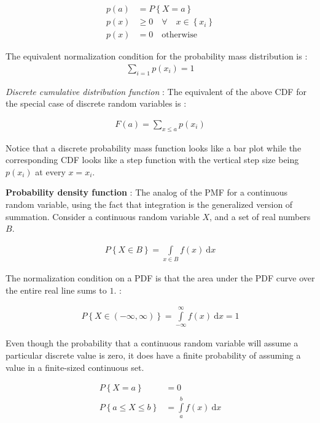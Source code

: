 \begin{align}
	p(a) &= P \left\{X = a\right\} \\
	p(x) &\geq 0 \quad \forall \quad x \in \left\{x_i\right\} \\
	p(x) &= 0 \quad \text{otherwise}
\end{align}

The equivalent normalization condition for the probability mass distribution is : 
\begin{align}
	\sum\limits_{i = 1} p(x_i) = 1
\end{align}

\textit{Discrete cumulative distribution function} : The equivalent of the above CDF for the special case of discrete random variables is : 

\begin{align}
	F(a) = \sum\limits_{x \leq a} p(x_i)
\end{align}

Notice that a discrete probability mass function looks like a bar plot while the corresponding CDF looks like a step function with the vertical step size being $ p(x_i) $ at every $ x = x_i $.

\textbf{Probability density function} : The analog of the PMF for a continuous random variable, using the fact that integration is the generalized version of summation. Consider a continuous random variable $ X $, and a set of real numbers $ B $.

\begin{align}
	P \left\{X \in B \right\} = \int\limits_{x \in B} f(x) \ \mathrm{d}x
\end{align}

The normalization condition on a PDF is that the area under the PDF curve over the entire real line sums to $ 1 $. : 

\begin{align}
	P \left\{X \in \left(-\infty , \infty \right) \right\} = \int\limits_{-\infty}^{\infty} f(x) \ \mathrm{d}x = 1
\end{align}

Even though the probability that a continuous random variable will assume a particular discrete value is zero, it does have a finite probability of assuming a value in a finite-sized continuous set.

\begin{align}
	P \left\{X = a \right\} &= 0 \\
	P \left\{ a \leq X \leq b \right\} &= \int\limits_{a}^{b} f(x) \ \mathrm{d}x
\end{align}

